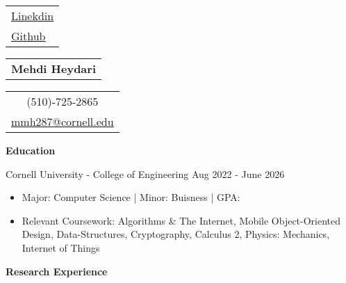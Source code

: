 \documentclass{article}
\begin{document}
\sffamily
\begin{onehalfspacing}
{\large\begin{tabular}[c]{l}
    \underline{\href{https://www.linkedin.com/in/mehdi-heydari}{Linekdin}} \\
    \underline{\href{https://github.com/MehdiMHeydari}{Github}}
\end{tabular}}\hfill
{\Huge\begin{tabular}[c]{c}
    \bfseries  Mehdi Heydari
\end{tabular}}\hfill
{\large\begin{tabular}[c]{c}
    (510)-725-2865\\
    \underline{\href{mailto:mmh287@cornell.edu}{mmh287@cornell.edu}}
\end{tabular}}
\end{onehalfspacing}

\vspace*{0.35cm}


\noindent\large{\bfseries Education \vspace*{0.2cm}}

\normalsize{
\noindent Cornell University - College of Engineering \hfill Aug 2022 - June 2026
}
\small{
\begin{itemize}[noitemsep]
    \item Major: Computer Science | Minor: Buisness | GPA:
    \item Relevant Coursework: Algorithms \& The Internet, Mobile Object-Oriented Design, Data-Structures, Cryptography, Calculus 2, Physics: Mechanics, Internet of Things
\end{itemize}
\vspace*{0.2cm}
}


\noindent\large{\bfseries Research Experience \vspace*{0.2cm}}
\end{document}
